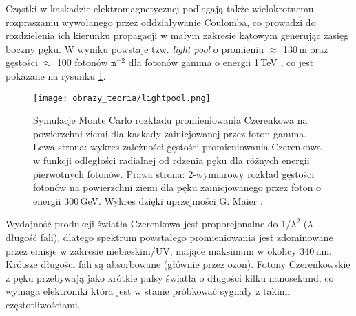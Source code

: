 \documentclass[a4paper,11pt,twoside]{article}
\begin{document}
Cząstki w kaskadzie elektromagnetycznej podlegają także wielokrotnemu rozpraszaniu wywołanego przez oddziaływanie Coulomba, co prowadzi do rozdzielenia ich kierunku propagacji w małym zakresie kątowym generując zasięg boczny pęku. W wyniku powstaje tzw. \textsl{light pool} o promieniu $\approx$ 130\,m oraz gęstości $\approx$ 100 fotonów $\mathtt{m^{-2}}$ dla fotonów gamma o energii 1\,TeV \cite{IACT}, co jest pokazane na rysunku \ref{fig:lightpool}.
\begin{figure}[H] 
\centering
\texttt{[image: obrazy\_teoria/lightpool.png]}
\caption{Symulacje Monte Carlo rozkładu promieniowania Czerenkowa na powierzchni ziemi dla kaskady zainicjowanej przez foton gamma. Lewa strona: wykres zależności gęstości promieniowania Czerenkowa w funkcji odległości radialnej od rdzenia pęku dla różnych energii pierwotnych fotonów. Prawa strona: 2-wymiarowy rozkład gęstości fotonów na powierzchni ziemi dla pęku zainicjowanego przez foton o energii 300\,GeV. Wykres dzięki uprzejmości G. Maier \cite{IACT}.}
\label{fig:lightpool}
\end{figure}
Wydajność produkcji światła Czerenkowa jest proporcjonalne do 1/$\lambda^2$ ($\lambda$ --- długość fali), dlatego spektrum powstałego promieniowania jest zdominowane przez emisje w zakresie niebieskim/UV, mające maksimum w okolicy 340\,nm. Krótsze długości fali są absorbowane (głównie przez ozon). Fotony Czerenkowskie z pęku przebywają jako krótkie pulsy światła o długości kilku nanosekund, co wymaga elektroniki która jest w stanie próbkować sygnały z takimi częstotliwościami.
\end{document}
